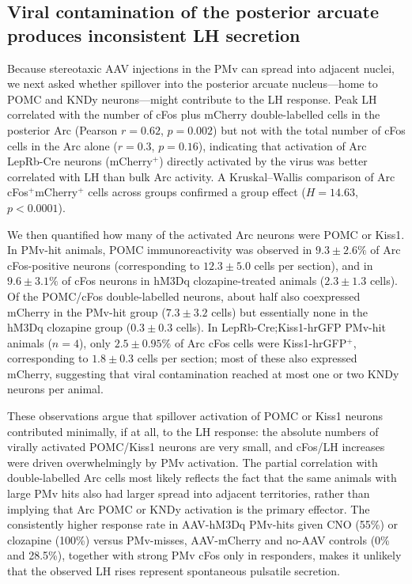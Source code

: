 \documentclass[11pt]{article}
\begin{document}
\subsection{Viral contamination of the posterior arcuate produces inconsistent LH secretion}
Because stereotaxic AAV injections in the PMv can spread into adjacent nuclei, we next asked whether spillover into the posterior arcuate nucleus---home to POMC and KNDy neurons---might contribute to the LH response. Peak LH correlated with the number of cFos plus mCherry double-labelled cells in the posterior Arc (Pearson $r=0.62$, $p=0.002$) but not with the total number of cFos cells in the Arc alone ($r=0.3$, $p=0.16$), indicating that activation of Arc LepRb-Cre neurons (mCherry$^{+}$) directly activated by the virus was better correlated with LH than bulk Arc activity. A Kruskal--Wallis comparison of Arc cFos$^{+}$mCherry$^{+}$ cells across groups confirmed a group effect ($H=14.63$, $p<0.0001$).

We then quantified how many of the activated Arc neurons were POMC or Kiss1. In PMv-hit animals, POMC immunoreactivity was observed in $9.3\pm2.6\%$ of Arc cFos-positive neurons (corresponding to $12.3\pm5.0$ cells per section), and in $9.6\pm3.1\%$ of cFos neurons in hM3Dq clozapine-treated animals ($2.3\pm1.3$ cells). Of the POMC/cFos double-labelled neurons, about half also coexpressed mCherry in the PMv-hit group ($7.3\pm3.2$ cells) but essentially none in the hM3Dq clozapine group ($0.3\pm0.3$ cells). In LepRb-Cre;Kiss1-hrGFP PMv-hit animals ($n=4$), only $2.5\pm0.95\%$ of Arc cFos cells were Kiss1-hrGFP$^{+}$, corresponding to $1.8\pm0.3$ cells per section; most of these also expressed mCherry, suggesting that viral contamination reached at most one or two KNDy neurons per animal.

These observations argue that spillover activation of POMC or Kiss1 neurons contributed minimally, if at all, to the LH response: the absolute numbers of virally activated POMC/Kiss1 neurons are very small, and cFos/LH increases were driven overwhelmingly by PMv activation. The partial correlation with double-labelled Arc cells most likely reflects the fact that the same animals with large PMv hits also had larger spread into adjacent territories, rather than implying that Arc POMC or KNDy activation is the primary effector. The consistently higher response rate in AAV-hM3Dq PMv-hits given CNO (55\%) or clozapine (100\%) versus PMv-misses, AAV-mCherry and no-AAV controls (0\% and 28.5\%), together with strong PMv cFos only in responders, makes it unlikely that the observed LH rises represent spontaneous pulsatile secretion.
\end{document}
